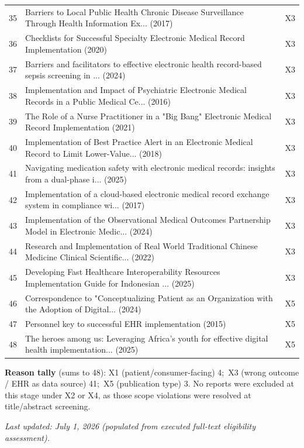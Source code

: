 \begin{longtable}{p{0.8cm} p{11.5cm} p{1.6cm}}
35 & Barriers to Local Public Health Chronic Disease Surveillance Through Health Information Ex... (2017) & X3 \\
\rowcolor{rowgray}
36 & Checklists for Successful Specialty Electronic Medical Record Implementation (2020) & X3 \\
37 & Barriers and facilitators to effective electronic health record-based sepsis screening in ... (2024) & X3 \\
\rowcolor{rowgray}
38 & Implementation and Impact of Psychiatric Electronic Medical Records in a Public Medical Ce... (2016) & X3 \\
39 & The Role of a Nurse Practitioner in a "Big Bang" Electronic Medical Record Implementation (2021) & X3 \\
\rowcolor{rowgray}
40 & Implementation of Best Practice Alert in an Electronic Medical Record to Limit Lower-Value... (2018) & X3 \\
41 & Navigating medication safety with electronic medical records: insights from a dual-phase i... (2025) & X3 \\
\rowcolor{rowgray}
42 & Implementation of a cloud-based electronic medical record exchange system in compliance wi... (2017) & X3 \\
43 & Implementation of the Observational Medical Outcomes Partnership Model in Electronic Medic... (2024) & X3 \\
\rowcolor{rowgray}
44 & Research and Implementation of Real World Traditional Chinese Medicine Clinical Scientific... (2022) & X3 \\
45 & Developing Fast Healthcare Interoperability Resources Implementation Guide for Indonesian ... (2025) & X3 \\
\rowcolor{rowgray}
46 & Correspondence to "Conceptualizing Patient as an Organization with the Adoption of Digital... (2024) & X5 \\
47 & Personnel key to successful EHR implementation (2015) & X5 \\
\rowcolor{rowgray}
48 & The heroes among us: Leveraging Africa's youth for effective digital health implementation... (2025) & X5 \\

\end{longtable}

\medskip
\noindent\textbf{Reason tally} (sums to 48):
X1 (patient/consumer-facing) 4;\ 
X3 (wrong outcome / EHR as data source) 41;\ 
X5 (publication type) 3.
No reports were excluded at this stage under X2 or X4, as those scope violations
were resolved at title/abstract screening.

\medskip
\noindent\textit{Last updated: July 1, 2026 (populated from executed full-text
eligibility assessment).}
